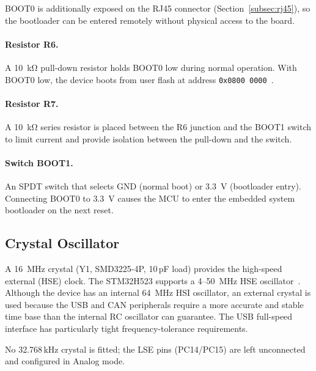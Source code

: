 BOOT0 is additionally exposed on the RJ45 connector
(Section~\ref{subsec:rj45}), so the bootloader can be entered remotely without physical
access to the board.

\paragraph{Resistor R6.}
A \SI{10}{\kilo\ohm} pull-down resistor holds BOOT0 low during normal operation. With
BOOT0 low, the device boots from user flash at address \texttt{0x0800\,0000}~\cite{ref1}.

\paragraph{Resistor R7.}
A \SI{10}{\kilo\ohm} series resistor is placed between the R6 junction and the BOOT1
switch to limit current and provide isolation between the pull-down and the switch.

\paragraph{Switch BOOT1.}
An SPDT switch that selects GND (normal boot) or \SI{3.3}{\volt} (bootloader entry).
Connecting BOOT0 to \SI{3.3}{\volt} causes the MCU to enter the embedded system
bootloader on the next reset.

\subsection{Crystal Oscillator}
\label{subsec:crystal}

A \SI{16}{\mega\hertz} crystal (Y1, SMD3225-4P, 10\,pF load) provides the high-speed
external (HSE) clock. The STM32H523 supports a 4--\SI{50}{\mega\hertz} HSE
oscillator~\cite{ref1}. Although the device has an internal \SI{64}{\mega\hertz} HSI
oscillator, an external crystal is used because the USB and CAN peripherals require a
more accurate and stable time base than the internal RC oscillator can guarantee. The USB
full-speed interface has particularly tight frequency-tolerance requirements.

No 32.768\,kHz crystal is fitted; the LSE pins (PC14/PC15) are left unconnected and
configured in Analog mode.

